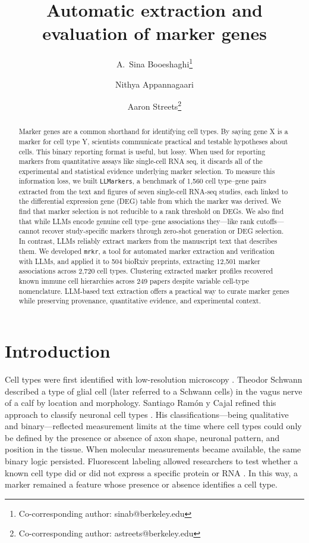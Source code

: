 \documentclass[10pt,twocolumn]{article}
\date{}
\title{\textbf{Automatic extraction and evaluation of marker genes}}
\author[1]{A.~Sina Booeshaghi\thanks{Co-corresponding author: sinab@berkeley.edu}}
\author[1]{Nithya Appannagaari}
\author[1,2,3,4]{Aaron Streets\thanks{Co-corresponding author: astreets@berkeley.edu}}
\affil[1]{\small Department of Bioengineering, University of California Berkeley, Berkeley, USA}
\affil[2]{\small Center for Computational Biology, University of California, Berkeley, USA}
\affil[3]{\small Biophysics Graduate Group, University of California, Berkeley, USA}
\affil[4]{\small Chan Zuckerberg Biohub -- San Francisco, USA}
\theoremstyle{plain}
\theoremstyle{definition}
\theoremstyle{remark}
\begin{document}
\maketitle


\begin{abstract}
Marker genes are a common shorthand for identifying cell types. By saying gene X is a marker for cell type Y, scientists communicate practical and testable hypotheses about cells. This binary reporting format is useful, but lossy. When used for reporting markers from quantitative assays like single-cell RNA seq, it discards all of the experimental and statistical evidence underlying marker selection. To measure this information loss, we built \texttt{LLMarkers}, a benchmark of 1{,}560 cell type--gene pairs extracted from the text and figures of seven single-cell RNA-seq studies, each linked to the differential expression gene (DEG) table from which the marker was derived. We find that marker selection is not reducible to a rank threshold on DEGs. We also find that while LLMs encode genuine cell type--gene associations they---like rank cutoffs---cannot recover study-specific markers through zero-shot generation or DEG selection. In contrast, LLMs reliably extract markers from the manuscript text that describes them. We developed \texttt{mrkr}, a tool for automated marker extraction and verification with LLMs, and applied it to 504 bioRxiv preprints, extracting 12{,}501 marker associations across 2{,}720 cell types. Clustering extracted marker profiles recovered known immune cell hierarchies across 249 papers despite variable cell-type nomenclature. LLM-based text extraction offers a practical way to curate marker genes while preserving provenance, quantitative evidence, and experimental context.

\end{abstract}

\section{Introduction}

Cell types were first identified with low-resolution microscopy \citep{schwann1839celltheory}. Theodor Schwann described a type of glial cell (later referred to a Schwann cells) in the vagus nerve of a calf by location and morphology. Santiago Ramón y Cajal refined this approach to classify neuronal cell types \citep{Sotelo_2003}. His classifications---being qualitative and binary---reflected measurement limits at the time where cell types could only be defined by the presence or absence of axon shape, neuronal pattern, and position in the tissue. When molecular measurements became available, the same binary logic persisted. Fluorescent labeling allowed researchers to test whether a known cell type did or did not express a specific protein or RNA \citep{Coons_1941}. In this way, a marker remained a feature whose presence or absence identifies a cell type.
\end{document}
